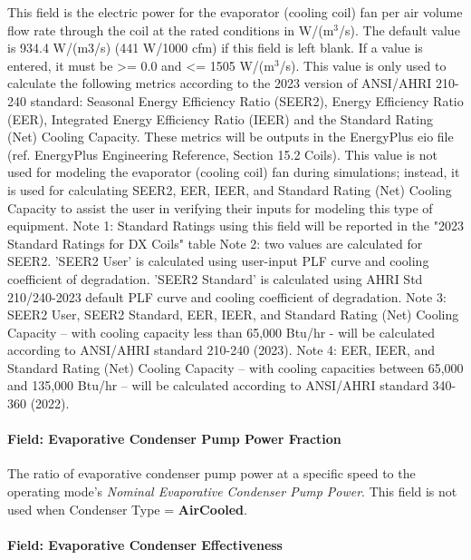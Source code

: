 This field is the electric power for the evaporator (cooling coil) fan per air volume flow rate through the coil at the rated conditions in W/(m\(^{3}\)/s). The default value is 934.4 W/(m3/s) (441 W/1000 cfm) if this field is left blank. If a value is entered, it must be \textgreater{}= 0.0 and \textless{}= 1505 W/(m\(^{3}\)/s). This value is only used to calculate the following metrics according to the 2023 version of ANSI/AHRI 210-240 standard: Seasonal Energy Efficiency Ratio (SEER2), Energy Efficiency Ratio (EER), Integrated Energy Efficiency Ratio (IEER) and the Standard Rating (Net) Cooling Capacity.  These metrics will be outputs in the EnergyPlus eio file (ref. EnergyPlus Engineering Reference, Section 15.2 Coils). This value is not used for modeling the evaporator (cooling coil) fan during simulations; instead, it is used for calculating SEER2, EER, IEER, and Standard Rating (Net) Cooling Capacity to assist the user in verifying their inputs for modeling this type of equipment. 
Note 1: Standard Ratings using this field will be reported in the "2023 Standard Ratings for DX Coils" table
Note 2: two values are calculated for SEER2. 'SEER2 User' is calculated using user-input PLF curve and cooling coefficient of degradation. 'SEER2 Standard' is calculated using AHRI Std 210/240-2023 default PLF curve and cooling coefficient of degradation.
Note 3: SEER2 User, SEER2 Standard, EER, IEER, and Standard Rating (Net) Cooling Capacity -- with cooling capacity less than 65,000 Btu/hr - will be calculated according to ANSI/AHRI standard 210-240 (2023).
Note 4: EER, IEER, and Standard Rating (Net) Cooling Capacity -- with cooling capacities between 65,000 and 135,000 Btu/hr -- will be calculated according to ANSI/AHRI standard 340-360 (2022).

\paragraph{Field: Evaporative Condenser Pump Power Fraction}\label{field-evaporative-condenser-pump-power-fraction}

The ratio of evaporative condenser pump power at a specific speed to the operating mode's \textit{Nominal Evaporative Condenser Pump Power}. This field is not used when Condenser Type = \textbf{AirCooled}.

\paragraph{Field: Evaporative Condenser Effectiveness}

